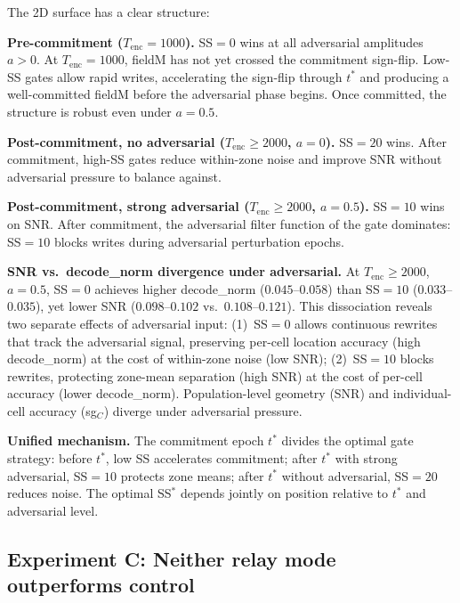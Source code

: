 \documentclass[11pt,a4paper]{article}
\begin{document}
The 2D surface has a clear structure:

\textbf{Pre-commitment ($T_\mathrm{enc}=1000$).}
SS$=0$ wins at all adversarial amplitudes $a > 0$.
At $T_\mathrm{enc}=1000$, fieldM has not yet crossed the commitment sign-flip.
Low-SS gates allow rapid writes, accelerating the sign-flip through $t^*$ and
producing a well-committed fieldM before the adversarial phase begins.
Once committed, the structure is robust even under $a=0.5$.

\textbf{Post-commitment, no adversarial ($T_\mathrm{enc}\geq 2000$, $a=0$).}
SS$=20$ wins.
After commitment, high-SS gates reduce within-zone noise and improve SNR without
adversarial pressure to balance against.

\textbf{Post-commitment, strong adversarial ($T_\mathrm{enc}\geq 2000$, $a=0.5$).}
SS$=10$ wins on SNR.
After commitment, the adversarial filter function of the gate dominates:
SS$=10$ blocks writes during adversarial perturbation epochs.

\textbf{SNR vs.\ decode\_norm divergence under adversarial.}
At $T_\mathrm{enc}\geq 2000$, $a=0.5$, SS$=0$ achieves higher decode\_norm
($0.045$--$0.058$) than SS$=10$ ($0.033$--$0.035$), yet lower SNR ($0.098$--$0.102$
vs.\ $0.108$--$0.121$).
This dissociation reveals two separate effects of adversarial input:
(1)~SS$=0$ allows continuous rewrites that track the adversarial signal, preserving
per-cell location accuracy (high decode\_norm) at the cost of within-zone noise
(low SNR);
(2)~SS$=10$ blocks rewrites, protecting zone-mean separation (high SNR) at the
cost of per-cell accuracy (lower decode\_norm).
Population-level geometry (SNR) and individual-cell accuracy (sg$_C$) diverge under
adversarial pressure.

\textbf{Unified mechanism.}
The commitment epoch $t^*$ divides the optimal gate strategy:
before $t^*$, low SS accelerates commitment;
after $t^*$ with strong adversarial, SS$=10$ protects zone means;
after $t^*$ without adversarial, SS$=20$ reduces noise.
The optimal SS$^*$ depends jointly on position relative to $t^*$ and adversarial level.

\subsection{Experiment C: Neither relay mode outperforms control}
\end{document}

